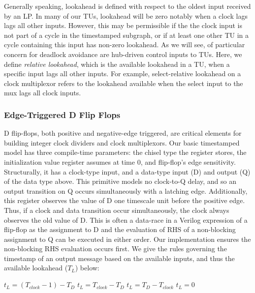 Generally speaking, lookahead is defined with respect to the oldest input
received by an LP. In many of our TUs, lookahead will be zero notably when a
clock lags lags all other inputs. However, this may be permissible if the the
clock input is not part of a cycle in the timestamped subgraph, or if at least
one other TU in a cycle containing this input has non-zero lookahead. As we
will see, of particular concern for deadlock avoidance are hub-driven control inputs to TUs. Here, we
define \emph{relative lookahead}, which is the available lookahead in a TU,
when a specific input lags all other inputs. For example, select-relative
lookahead on a clock multiplexor refers to the lookahead available when the
select input to the mux lags all clock inputs.

\subsubsection{Edge-Triggered D Flip Flops}
D flip-flops, both positive and negative-edge triggered, are critical elements
for building integer clock dividers and clock multiplexors. Our basic
timestamped model has three compile-time parameters: the chisel type the
register stores, the initialization value register assumes at time 0, and
flip-flop's edge sensitivity.  Structurally, it has a clock-type input, and a
data-type input (D) and output (Q) of the data type above.  This primitive
models no clock-to-Q delay, and so an output transition on Q occurs
simultaneously with a latching edge. Additionally, this register observes the value of D one
timescale unit before the positive edge. Thus, if a clock and data transition
occur simultaneously, the clock always observes the old value of D.  This is
often a data-race in a Verilog expression of a flip-flop as the assignment to D
and the evaluation of RHS of a non-blocking assignment to Q can be executed in
either order. Our implementation ensures the non-blocking RHS evaluation occurs
first. We give the rules governing the timestamp of an output message based on
the available inputs, and thus the available lookahead ($T_L$) below:

\begin{algorithmic}
            \State $t_{L} = (T_{clock} - 1) - T_{D}$
        \Else
            \State $t_{L} = T_{clock} - T_{D}$
        \EndIf
    \Else
            \State $t_{L} = T_{D} - T_{clock}$
        \Else
            \State $t_{L} = 0$
        \EndIf
    \EndIf
\end{algorithmic}

